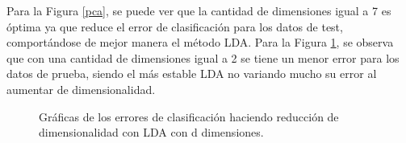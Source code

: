 \documentclass[letter, 10pt]{article}
\begin{document}
Para la Figura \ref{pca}, se puede ver que la cantidad de dimensiones igual a 7 es óptima ya que reduce el error de clasificación para los datos de test, comportándose de mejor manera el método LDA. Para la Figura \ref{lda}, se observa que con una cantidad de dimensiones igual a 2 se tiene un menor error para los datos de prueba, siendo el más estable LDA no variando mucho su error al aumentar de dimensionalidad.\\

\begin{figure}[h!]
\begin{center}
\caption{Gráficas de los errores de clasificación haciendo reducción de dimensionalidad con LDA con d dimensiones.} 
\label{lda}
\end{center}
\end{figure}
\end{document}
